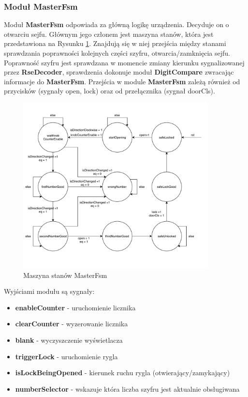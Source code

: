 \documentclass[12pt] {article}
\begin{document}
\subsubsection{Moduł MasterFsm}
Moduł \textbf{MasterFsm} odpowiada za główną logikę urządzenia. Decyduje on o otwarciu sejfu. Głównym jego członem jest maszyna stanów, która jest przedstawiona na Rysunku \ref{fig:masterfsm}. Znajdują się w niej przejścia między stanami sprawdzania poprawności kolejnych części szyfru, otwarcia/zamknięcia sejfu. Poprawność szyfru jest sprawdzana w momencie zmiany kierunku sygnalizowanej przez \textbf{RseDecoder}, sprawdzenia dokonuje moduł \textbf{DigitCompare} zwracając informacje do \textbf{MasterFsm}. Przejścia w module \textbf{MasterFsm} zależą również od przycisków (sygnały open, lock) oraz od przełącznika (sygnał doorCls).

\begin{figure}[H]
\centering
\includegraphics[width=0.9\textwidth]{res/master_fsm_diagram.pdf}
\caption{Maszyna stanów MasterFsm}
\label{fig:masterfsm}
\end{figure}

\newpage
Wyjściami modułu są sygnały:
\begin{itemize}
\item \textbf{enableCounter} - uruchomienie licznika
\item \textbf{clearCounter} - wyzerowanie licznika
\item \textbf{blank} - wyczyszczenie wyświetlacza
\item \textbf{triggerLock} - uruchomienie rygla
\item \textbf{isLockBeingOpened} - kierunek ruchu rygla (otwierający/zamykający)
\item \textbf{numberSelector} - wskazuje która liczba szyfru jest aktualnie obsługiwana
\end{itemize}
\end{document}
